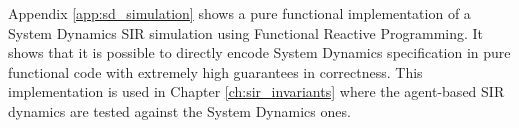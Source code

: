 \medskip

Appendix \ref{app:sd_simulation} shows a pure functional implementation of a System Dynamics SIR simulation using Functional Reactive Programming. It shows that it is possible to directly encode System Dynamics specification in pure functional code with extremely high guarantees in correctness. This implementation is used in Chapter \ref{ch:sir_invariants} where the agent-based SIR dynamics are tested against the System Dynamics ones.
